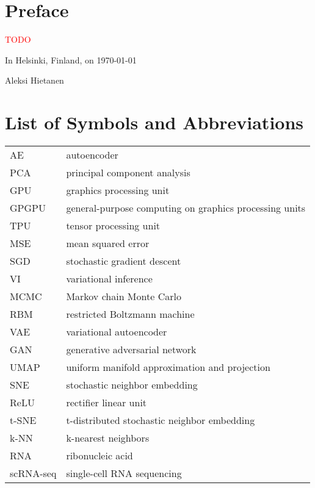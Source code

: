 \chapter*{Preface}

\textcolor{red}{TODO}

\vspace{2\baselineskip}

In Helsinki, Finland, on \today

\vspace{2\baselineskip}

Aleksi Hietanen

\tableofcontents
\listoffigures
\listoftables
\chapter*{List of Symbols and Abbreviations}


\begin{tabular}[h]{@{} p{} p{} @{}}
AE        & autoencoder \\
PCA       & principal component analysis \\
GPU       & graphics processing unit \\
GPGPU     & general-purpose computing on graphics processing units \\
TPU       & tensor processing unit \\
MSE       & mean squared error \\
SGD       & stochastic gradient descent \\
VI        & variational inference \\
MCMC      & Markov chain Monte Carlo \\
RBM       & restricted Boltzmann machine \\
VAE       & variational autoencoder \\
GAN       & generative adversarial network \\
UMAP      & uniform manifold approximation and projection \\
SNE       & stochastic neighbor embedding \\
ReLU      & rectifier linear unit \\
t-SNE     & t-distributed stochastic neighbor embedding \\
k-NN      & k-nearest neighbors \\
RNA       & ribonucleic acid \\
scRNA-seq & single-cell RNA sequencing
\end{tabular}

